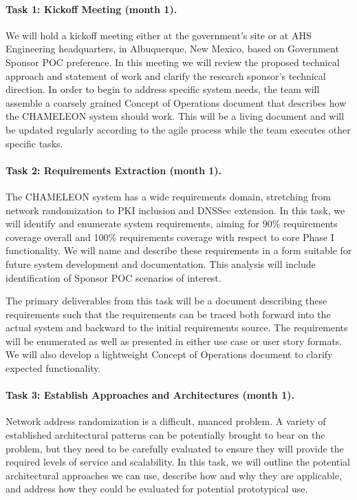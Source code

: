 \documentclass{sbir}
\begin{document}
\paragraph{Task 1: Kickoff Meeting (month 1).}
We will hold a kickoff meeting either at the government's site or at AHS Engineering headquarters, in Albuquerque, New Mexico, based on Government Sponsor POC preference. In this meeting we will review the proposed technical approach and statement of work and clarify the research sponsor's technical direction. In order to begin to address specific system needs, the team will assemble a coarsely grained Concept of Operations document that describes how the CHAMELEON system should work. This will be a living document and will be updated regularly according to the agile process while the team executes other specific tasks. 

\paragraph{Task 2: Requirements Extraction (month 1).}
The CHAMELEON system has a wide requirements domain, stretching from network randomization to PKI inclusion and DNSSec extension. In this task, we will identify and enumerate system requirements, aiming for 90\% requirements coverage overall and 100\% requirements coverage with respect to core Phase I functionality. We will name and describe these requirements in a form suitable for future system development and documentation. This analysis will include identification of Sponsor POC scenarios of interest.

The primary deliverables from this task will be a document describing these requirements such that the requirements can be traced both forward into the actual system and backward to the initial requirements source. The requirements will be enumerated as well as presented in either use case or user story formats. We will also develop a lightweight Concept of Operations document to clarify expected functionality.

\paragraph{Task 3: Establish Approaches and Architectures (month 1).}
Network address randomization is a difficult, nuanced problem. A variety of established architectural patterns can be potentially brought to bear on the problem, but they need to be carefully evaluated to ensure they will provide the required levels of service and scalability. In this task, we will outline the potential architectural approaches we can use, describe how and why they are applicable, and address how they could be evaluated for potential prototypical use.
\end{document}
